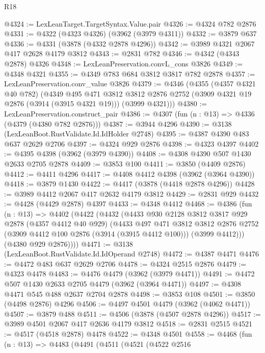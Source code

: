 \begin{lexlean}{R18}
\begin{coremodule}
@4324 := LexLeanTarget.TargetSyntax.Value.pair
@4326 := @4324 @782 @2876
@4331 := @4322 (@4323 @4326) (@3962 (@3979 @4311))
@4332 := @3879 @637
@4336 := @4331 (@3878 (@4332 @2878 @4296))
@4342 := @3989 @4321 @2067 @417 @2628 @4179 @3812
@4343 := @2831 @782
@4346 := @4342 (@4343 @2878) @4326
@4348 := LexLeanPreservation.convL_cons @3826
@4349 := @4348 @4321
@4355 := @4349 @783 @684 @3812 @3817 @782 @2878
@4357 := LexLeanPreservation.conv_value @3826
@4379 := @4346
    (@4355
      (@4357 @4321 @40 @782)
      (@4349
        @495
        @471
        @3812
        @3812
        @2876
        @2752
        (@3909 @4321 @19 @2876 (@3914 (@3915 @4321 @19)))
        (@3999 @4321)))
@4380 := LexLeanPreservation.construct_pair
@4386 := @4307 (fun (n : @13) => @4336 (@4379 (@4380 @782 @2876)))
@4387 := @3944 @4296
@4390 := @3138 (LexLeanBoot.RustValidate.Id.IdHolder @2748)
@4395 := @4387 @4390 @483 @637 @2629 @2706
@4397 := @4324 @929 @2876
@4398 := @4323 @4397
@4402 := @4395 @4398 (@3962 (@3979 @4390))
@4408 := @4308 @4390 @507 @1430 @2633 @2705 @2878
@4409 := @3853 @100
@4411 := @3850 (@4409 @2876)
@4412 := @4411 @4296
@4417 := @4408 @4412 @4398 (@3962 (@3964 @4390))
@4418 := @3879 @1430
@4422 := @4417 (@3878 (@4418 @2878 @4296))
@4428 := @3989 @4412 @2067 @417 @2632 @4179 @3812
@4429 := @2831 @929
@4432 := @4428 (@4429 @2878) @4397
@4433 := @4348 @4412
@4468 := @4386
    (fun (n : @13) =>
    @4402
      (@4422
        (@4432
          (@4433
            @930
            @2128
            @3812
            @3817
            @929
            @2878
            (@4357 @4412 @40 @929)
            (@4433
              @497
              @471
              @3812
              @3812
              @2876
              @2752
              (@3909 @4412 @100 @2876 (@3914 (@3915 @4412 @100)))
              (@3999 @4412)))
          (@4380 @929 @2876))))
@4471 := @3138 (LexLeanBoot.RustValidate.Id.IdOperand @2748)
@4472 := @4387 @4471
@4476 := @4472 @483 @637 @2629 @2706
@4478 := @4324 @2515 @2876
@4479 := @4323 @4478
@4483 := @4476 @4479 (@3962 (@3979 @4471))
@4491 := @4472 @507 @1430 @2633 @2705 @4479 (@3962 (@3964 @4471))
@4497 := @4308 @4471 @545 @488 @2637 @2704 @2878
@4498 := @3853 @108
@4501 := @3850 (@4498 @2876) @4296
@4506 := @4497 @4501 @4479 (@3962 (@4062 @4471))
@4507 := @3879 @488
@4511 := @4506 (@3878 (@4507 @2878 @4296))
@4517 := @3989 @4501 @2067 @417 @2636 @4179 @3812
@4518 := @2831 @2515
@4521 := @4517 (@4518 @2878) @4478
@4522 := @4348 @4501
@4558 := @4468
    (fun (n : @13) =>
    @4483
      (@4491
        (@4511
          (@4521
            (@4522
              @2516

\end{coremodule}
\end{lexlean}
